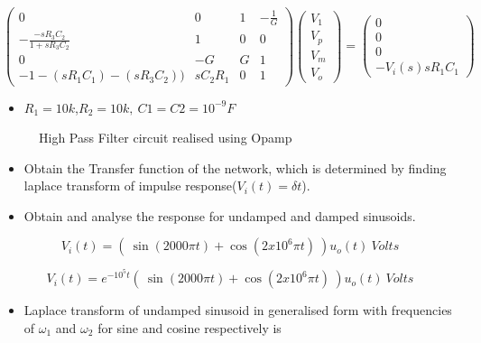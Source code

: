 \documentclass[10pt,a4paper]{article}
\providecommand{\tightlist}{%
      \setlength{\itemsep}{0pt}\setlength{\parskip}{0pt}}
\begin{document}
\[\begin{pmatrix} 0 & 0 & 1 & -\frac{1}{G} \\ -\frac{-sR_3C_2}{1+sR_3C_2} & 1 & 0 & 0 \\ 0 & -G & G & 1 \\ -1-(sR_1C_1)-(sR_3C_2)) & sC_2R_1 & 0 & 1 \end{pmatrix}\begin{pmatrix} V_1 \\ V_p \\ V_m \\ V_o \end{pmatrix} = \begin{pmatrix} 0 \\ 0 \\ 0 \\ -V_i(s)sR_1C_1 \end{pmatrix}\]

\begin{itemize}
\item 
	$R_1 = 10k$,$ R_2 = 10k, \ C1 = C2 = 10^{-9} F$
\end{itemize}

\begin{figure}[!h]
\centering
{}
\caption{High Pass Filter circuit realised using Opamp}
\end{figure}


\begin{itemize}
\item Obtain the Transfer function of the network, which is determined by
finding laplace transform of impulse response(\(V_{i}(t) = \delta t\)).
\end{itemize}


\begin{itemize}
\tightlist
\item
  Obtain and analyse the response for undamped and damped sinusoids.
\end{itemize}

\begin{equation}
V_{i}(t) = ( \ \sin(2000\pi t) + \cos(2x10^{6}\pi t) \ )u_{o}(t) \ Volts
\end{equation}

\begin{equation}
V_{i}(t) = e^{-10^{5}t}( \ \sin(2000\pi t) + \cos(2x10^{6}\pi t) \ )u_{o}(t) \ Volts
\end{equation}

\begin{itemize}
\tightlist
\item
  Laplace transform of undamped sinusoid in generalised form with
  frequencies of \(\omega_1\) and \(\omega_2\) for sine and cosine
  respectively is
\end{itemize}
\end{document}

